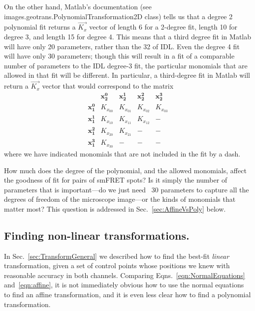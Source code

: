\documentclass[11pt]{article}
\begin{document}
On the other hand, Matlab's documentation (see images.geotrans.PolynomialTransformation2D class) tells us that a degree 2 polynomial fit returns a $\vec{K_x}$ vector of length 6 for a 2-degree fit, length 10 for degree 3, and length 15 for degree 4.  This means that a third degree fit in Matlab will have only 20 parameters, rather than the 32 of IDL.  Even the degree 4 fit will have only 30 parameters; though this will result in a fit of a comparable number of parameters to the IDL degree-3 fit, the particular monomials that are allowed in that fit will be different.  In particular, a third-degree fit in Matlab will return a $\vec{K_x}$ vector that would correspond to the matrix
\begin{equation}
 \begin{matrix} 
            & \mathbf{x_2^0}         & \mathbf{x_2^1} & \mathbf{x_2^2}  & \mathbf{x_2^3} \\
\mathbf{x_1^0} & K_{x_{00}} & K_{x_{01}} & K_{x_{02}} & K_{x_{03}} \\
\mathbf{x_1^1} & K_{x_{10}} & K_{x_{11}} & K_{x_{12}} & - \\
\mathbf{x_1^2} & K_{x_{20}} & K_{x_{21}} & - & - \\
\mathbf{x_1^3} & K_{x_{30}} & - & - & -
\end{matrix} 
\end{equation}
where we have indicated monomials that are not included in the fit by a dash.

How much does the degree of the polynomial, and the allowed monomials, affect the goodness of fit for pairs of smFRET spots?  Is it simply the number of parameters that is important---do we just need ~30 parameters to capture all the degrees of freedom of the microscope image---or the kinds of monomials that matter most?  This question is addressed in Sec.~\ref{sec:AffineVsPoly} below.

\subsection{Finding non-linear transformations.}

In Sec.~\ref{sec:TransformGeneral} we described how to find the best-fit {\it linear} transformation, given a set of control points whose positions we knew with reasonable accuracy in both channels. Comparing Eqns.~\eqref{eqn:NormalEquations} and~\eqref{eqn:affine}, it is not immediately obvious how to use the normal equations to find an affine transformation, and it is even less clear how to find a polynomial transformation.
\end{document}
